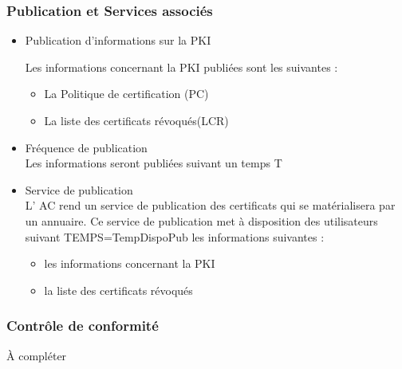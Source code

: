 \documentclass[a4paper,11pt,french]{article}
\begin{document}
\subsubsection{Publication et Services associés}
\begin{itemize}

\item Publication d’informations sur la PKI

Les informations concernant la PKI publiées sont les suivantes :
\begin{itemize}
\item La Politique de certification (PC)
\item La liste des certificats révoqués(LCR)
\end{itemize}

\item Fréquence de publication
\\Les informations seront publiées suivant un temps T

\item Service de publication
\\L' AC rend un service de publication des certificats qui se matérialisera par un annuaire. Ce service de publication met à disposition des utilisateurs suivant TEMPS=TempDispoPub les informations suivantes :
\begin{itemize}
\item les informations concernant la PKI
\item la liste des certificats révoqués
\end{itemize}

\end{itemize}

\subsubsection{Contrôle de conformité}
À compléter
\end{document}
